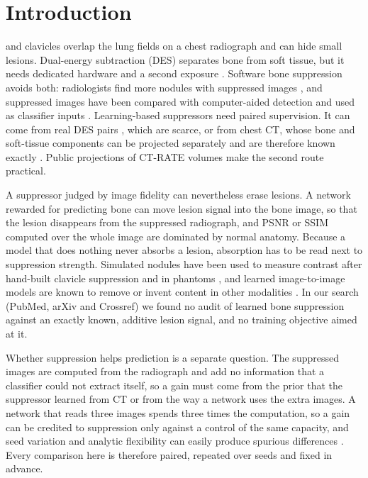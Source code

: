\section{Introduction}
\label{sec:intro}
 and clavicles overlap the lung fields on a chest radiograph and can hide small lesions. Dual-energy subtraction
(DES) separates bone from soft tissue, but it needs dedicated hardware and a second exposure \cite{kuhlman2006des,sun2026bsldm}.
Software bone suppression avoids both: radiologists find more nodules with suppressed images \cite{freedman2011lung}, and suppressed
images have been compared with computer-aided detection \cite{schalekamp2014cad} and used as classifier inputs
\cite{rajaraman2021bone}. Learning-based suppressors need paired supervision. It can come from real DES pairs
\cite{chen2024bsdiff,sun2026bsldm,sun2025gllcm,sun2026debonedit}, which are scarce, or from chest CT, whose bone and soft-tissue
components can be projected separately and are therefore known exactly \cite{angaitkar2026anatomy}. Public projections of CT-RATE
volumes \cite{hamamci2026ctrate} make the second route practical.

A suppressor judged by image fidelity can nevertheless erase lesions. A network rewarded for predicting bone can move lesion signal into
the bone image, so that the lesion disappears from the suppressed radiograph, and PSNR or SSIM computed over the whole image are dominated
by normal anatomy. Because a model that does nothing never absorbs a lesion, absorption has to be read next to suppression strength.
Simulated nodules have been used to measure contrast after hand-built clavicle suppression and in phantoms
\cite{hogeweg2013suppression,takagi2020dose}, and learned image-to-image models are known to remove or invent content in other
modalities \cite{cohen2018distribution,antun2020instabilities,bhadra2021hallucinations,tivnan2024hallucination}. In our search (PubMed,
arXiv and Crossref) we found no audit of learned bone suppression against an exactly known, additive lesion signal, and no training
objective aimed at it.

Whether suppression helps prediction is a separate question. The suppressed images are computed from the radiograph and add no
information that a classifier could not extract itself, so a gain must come from the prior that the suppressor learned from CT or from the
way a network uses the extra images. A network that reads three images spends three times the computation, so a gain can be credited to
suppression only against a control of the same capacity, and seed variation and analytic flexibility can easily produce spurious
differences \cite{varoquaux2022failures,simmons2011falsepositive}. Every comparison here is therefore paired, repeated over seeds and
fixed in advance.

